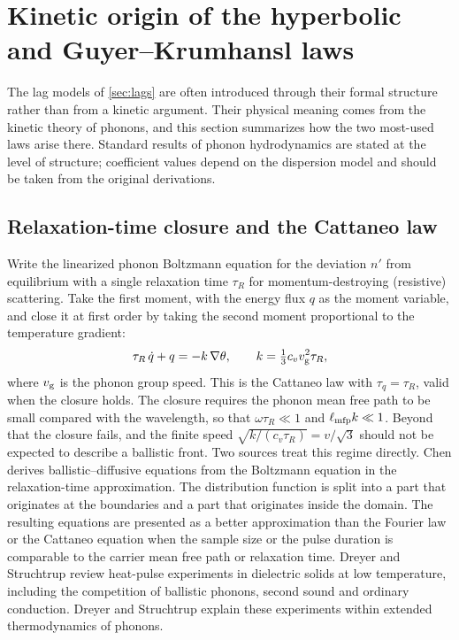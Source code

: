 \section{Kinetic origin of the hyperbolic and Guyer--Krumhansl laws}\label{sec:kinetic}

The lag models of \cref{sec:lags} are often introduced through their formal structure rather than from a kinetic argument. Their physical meaning comes from the kinetic theory of phonons, and this section summarizes how the two most-used laws arise there. Standard results of phonon hydrodynamics are stated at the level of structure; coefficient values depend on the dispersion model and should be taken from the original derivations.

\subsection{Relaxation-time closure and the Cattaneo law}
Write the linearized phonon Boltzmann equation for the deviation $n'$ from equilibrium with a single relaxation time $\tau_R$ for momentum-destroying (resistive) scattering. Take the first moment, with the energy flux $q$ as the moment variable, and close it at first order by taking the second moment proportional to the temperature gradient:
\begin{equation}\label{eq:cattkin}
\tau_R\,\dot q+q=-k\,\nabla\theta,\qquad k=\tfrac13 c_v v_{\rm g}^2\tau_R ,
\end{equation}
where $v_{\rm g}$ is the phonon group speed. This is the Cattaneo law with $\tau_q=\tau_R$, valid when the closure holds. The closure requires the phonon mean free path to be small compared with the wavelength, so that $\omega\tau_R\ll1$ and $\ell_{\rm mfp}k\ll1$. Beyond that the closure fails, and the finite speed $\sqrt{k/(c_v\tau_R)}=v/\sqrt3$ should not be expected to describe a ballistic front. Two sources treat this regime directly. Chen \citep{Chen2001} derives ballistic--diffusive equations from the Boltzmann equation in the relaxation-time approximation. The distribution function is split into a part that originates at the boundaries and a part that originates inside the domain. The resulting equations are presented as a better approximation than the Fourier law or the Cattaneo equation when the sample size or the pulse duration is comparable to the carrier mean free path or relaxation time. Dreyer and Struchtrup \citep{DreyerStruchtrup1993} review heat-pulse experiments in dielectric solids at low temperature, including the competition of ballistic phonons, second sound and ordinary conduction. Dreyer and Struchtrup explain these experiments within extended thermodynamics of phonons.

